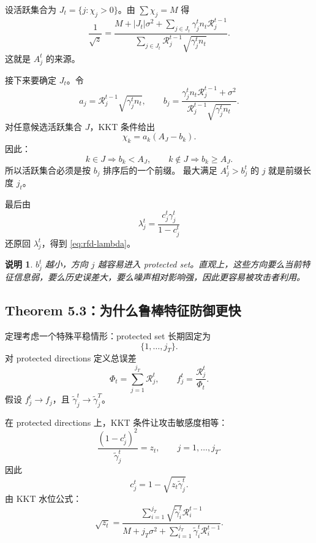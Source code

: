 \documentclass[UTF8,fontset=none,11pt]{ctexart}
\theoremstyle{cnstyle}
\newtheorem{remark}[theorem]{说明}
\newcommand{\calR}{\mathcal{R}}
\begin{document}
设活跃集合为 \(J_t=\{j:\chi_j>0\}\)。由 \(\sum\chi_j=M\) 得
\[
  \frac{1}{\sqrt z}
  =
  \frac{
  M+|J_t|\sigma^2+\sum_{j\in J_t}\gamma_j^tn_t\calR_j^{t-1}
  }{
  \sum_{j\in J_t}\calR_j^{t-1}\sqrt{\gamma_j^tn_t}
  } .
\]
这就是 \(A_j^t\) 的来源。

接下来要确定 \(J_t\)。令
\[
  a_j=\calR_j^{t-1}\sqrt{\gamma_j^tn_t},
  \qquad
  b_j=
  \frac{\gamma_j^tn_t\calR_j^{t-1}+\sigma^2}
  {\calR_j^{t-1}\sqrt{\gamma_j^tn_t}} .
\]
对任意候选活跃集合 \(J\)，KKT 条件给出
\[
  \chi_k=a_k(A_J-b_k).
\]
因此：
\[
  k\in J \Rightarrow b_k<A_J,
  \qquad
  k\notin J \Rightarrow b_k\ge A_J .
\]
所以活跃集合必须是按 \(b_j\) 排序后的一个前缀。
最大满足 \(A_j^t>b_j^t\) 的 \(j\) 就是前缀长度 \(j_t\)。

最后由
\[
  \lambda_j^t=\frac{c_j^t\gamma_j^t}{1-c_j^t}
\]
还原回 \(\lambda_j^t\)，得到 \eqref{eq:rfd-lambda}。

\begin{remark}
\(b_j^t\) 越小，方向 \(j\) 越容易进入 protected set。直观上，这些方向要么当前特征信息弱，要么历史误差大，要么噪声相对影响强，因此更容易被攻击者利用。
\end{remark}

\subsection{Theorem 5.3：为什么鲁棒特征防御更快}

定理考虑一个特殊平稳情形：protected set 长期固定为
\[
  \{1,\dots,j_T\}.
\]
对 protected directions 定义总误差
\[
  \Phi_t=\sum_{j=1}^{j_T}\calR_j^t,
  \qquad
  f_j^t=\frac{\calR_j^t}{\Phi_t}.
\]
假设 \(f_j^t\to f_j\)，且 \(\tilde\gamma_j^t\to\tilde\gamma_j^T\)。

在 protected directions 上，KKT 条件让攻击敏感度相等：
\[
  \frac{(1-c_j^t)^2}{\tilde\gamma_j^t}=z_t,
  \qquad j=1,\dots,j_T.
\]
因此
\[
  c_j^t=1-\sqrt{z_t\tilde\gamma_j^t}.
\]
由 KKT 水位公式：
\[
  \sqrt{z_t}
  =
  \frac{
  \sum_{i=1}^{j_T}\sqrt{\tilde\gamma_i^t}\calR_i^{t-1}
  }{
  M+j_T\sigma^2+\sum_{i=1}^{j_T}\tilde\gamma_i^t\calR_i^{t-1}
  } .
\]
\end{document}
